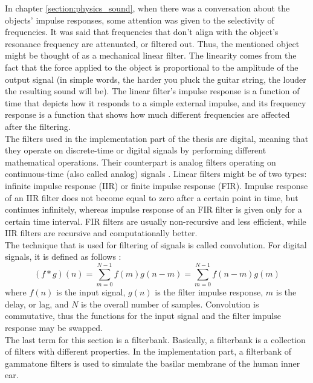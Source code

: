 In chapter \ref{section:physics_sound}, when there was a conversation about the objects' impulse responses, some attention was given to the selectivity of frequencies. It was said that frequencies that don't align with the object's resonance frequency are attenuated, or filtered out. Thus, the mentioned object might be thought of as a mechanical linear filter. The linearity comes from the fact that the force applied to the object is proportional to the amplitude of the output signal (in simple words, the harder you pluck the guitar string, the louder the resulting sound will be). The linear filter's impulse response is a function of time that depicts how it responds to a simple external impulse, and its frequency response is a function that shows how much different frequencies are affected after the filtering.\\

The filters used in the implementation part of the thesis are digital, meaning that they ope\-rate on discrete-time or digital signals by performing different mathematical operations. Their counterpart is analog filters operating on continuous-time (also called analog) signals \cite{Shenoi2005}. Linear filters might be of two types: infinite impulse response (IIR) or finite impulse response (FIR). Impulse response of an IIR filter does not become equal to zero after a certain point in time, but continues infinitely, whereas impulse response of an FIR filter is given only for a certain time interval. FIR filters are usually non-recursive and less efficient, while IIR filters are recursive and computationally better.\\

The technique that is used for filtering of signals is called convolution. For digital signals, it is defined as follows \cite{Schnupp2011}:
\begin{equation}
	(f*g)(n) = \sum_{m=0}^{N-1}f(m)g(n - m) = \sum_{m=0}^{N-1}f(n - m)g(m)
\end{equation}
where $f(n)$ is the input signal, $g(n)$ is the filter impulse response, $m$ is the delay, or lag, and $N$ is the overall number of samples. Convolution is commutative, thus the functions for the input signal and the filter impulse response may be swapped.\\

The last term for this section is a filterbank. Basically, a filterbank is a collection of filters with different properties. In the implementation part, a filterbank of gammatone filters is used to simulate the basilar membrane of the human inner ear.

